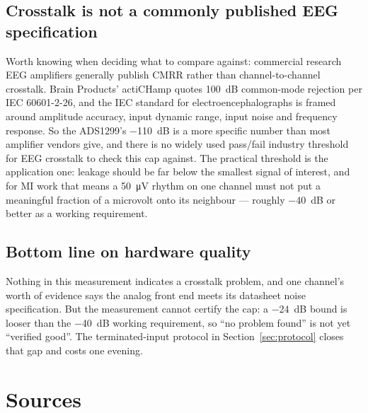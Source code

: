 \documentclass[11pt,a4paper]{article}
\begin{document}
\subsection*{Crosstalk is not a commonly published EEG specification}

Worth knowing when deciding what to compare against: commercial research EEG amplifiers
generally publish CMRR rather than channel-to-channel crosstalk. Brain Products' actiCHamp
quotes \SI{100}{\deci\bel} common-mode rejection per IEC 60601-2-26, and the IEC standard for
electroencephalographs is framed around amplitude accuracy, input dynamic range, input noise
and frequency response. So the ADS1299's \SI{-110}{\deci\bel} is a more specific number than
most amplifier vendors give, and there is no widely used pass/fail industry threshold for EEG
crosstalk to check this cap against. The practical threshold is the application one: leakage
should be far below the smallest signal of interest, and for MI work that means a
\SI{50}{\micro\volt} rhythm on one channel must not put a meaningful fraction of a microvolt
onto its neighbour --- roughly \SI{-40}{\deci\bel} or better as a working requirement.

\subsection*{Bottom line on hardware quality}

Nothing in this measurement indicates a crosstalk problem, and one channel's worth of evidence
says the analog front end meets its datasheet noise specification. But the measurement cannot
certify the cap: a \SI{-24}{\deci\bel} bound is looser than the \SI{-40}{\deci\bel} working
requirement, so ``no problem found'' is not yet ``verified good''. The terminated-input protocol
in Section~\ref{sec:protocol} closes that gap and costs one evening.

\section*{Sources}
\end{document}
